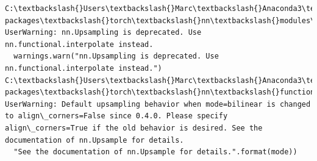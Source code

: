 \documentclass[11pt]{article}
\begin{document}
    \begin{Verbatim}[commandchars=\\\{\}]
C:\textbackslash{}Users\textbackslash{}Marc\textbackslash{}Anaconda3\textbackslash{}lib\textbackslash{}site-packages\textbackslash{}torch\textbackslash{}nn\textbackslash{}modules\textbackslash{}upsampling.py:122: UserWarning: nn.Upsampling is deprecated. Use nn.functional.interpolate instead.
  warnings.warn("nn.Upsampling is deprecated. Use nn.functional.interpolate instead.")
C:\textbackslash{}Users\textbackslash{}Marc\textbackslash{}Anaconda3\textbackslash{}lib\textbackslash{}site-packages\textbackslash{}torch\textbackslash{}nn\textbackslash{}functional.py:1961: UserWarning: Default upsampling behavior when mode=bilinear is changed to align\_corners=False since 0.4.0. Please specify align\_corners=True if the old behavior is desired. See the documentation of nn.Upsample for details.
  "See the documentation of nn.Upsample for details.".format(mode))

    \end{Verbatim}
\end{document}
